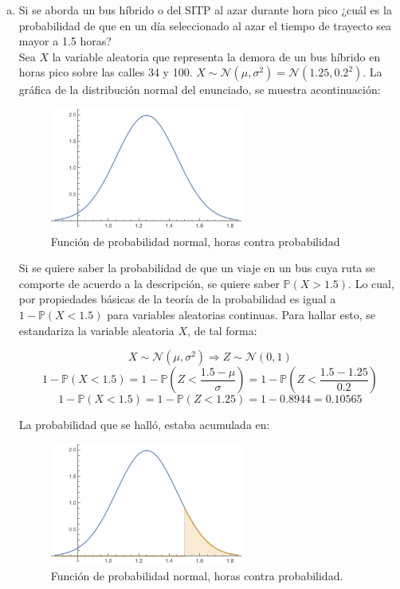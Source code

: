 \documentclass[11pt, spanish]{article}
\begin{document}
\begin{enumerate}[(a)]

\item Si se aborda un bus híbrido o del SITP al azar durante hora pico ¿cuál es la
probabilidad de que en un día seleccionado al azar el tiempo de trayecto sea mayor a 1.5
horas?\\

Sea $X$ la variable aleatoria que representa la demora de un bus híbrido en horas pico sobre las calles 34 y 100. $X \sim \mathcal{N} (\mu , \sigma ^2) = \mathcal{N} (1.25, 0.2^2)$. La gráfica de la distribución normal del enunciado, se muestra acontinuación:

\begin{figure}[h]
    \centering
    \includegraphics[width=0.6\textwidth]{fig3-1.png}
    \caption{Función de probabilidad normal, horas contra probabilidad}
    \label{fig:prob_dist1}
\end{figure}

Si se quiere saber la probabilidad de que un viaje en un bus cuya ruta se comporte de acuerdo a la descripción, se quiere saber $\mathbb{P}(X > 1.5)$. Lo cual, por propiedades básicas de la teoría de la probabilidad es igual a $1 - \mathbb{P}(X < 1.5)$ para variables aleatorias continuas. Para hallar esto, se estandariza la variable aleatoria $X$, de tal forma:

$$X \sim \mathcal{N} (\mu , \sigma ^2) \Rightarrow Z \sim \mathcal{N} (0,  1)$$
$$1 - \mathbb{P}(X < 1.5) = 1 - \mathbb{P}\left(Z < \frac{1.5 - \mu}{\sigma}\right) = 1 - \mathbb{P}\left(Z < \frac{1.5 - 1.25}{0.2}\right)$$
$$1 - \mathbb{P}(X < 1.5) = 1 - \mathbb{P}\left(Z < 1.25 \right) = 1 - 0.8944 = 0.10565$$

\pagebreak
La probabilidad que se halló, estaba acumulada en:

\begin{figure}[h]
    \centering
    \includegraphics[width=0.6\textwidth]{fig3-2.png}
    \caption{Función de probabilidad normal, horas contra probabilidad.}
    \label{fig:prob_dist2}
\end{figure}


\end{enumerate}
\end{document}
